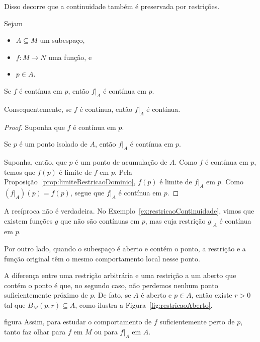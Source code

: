Disso decorre que a continuidade também é preservada por restrições.

\begin{corollary}\label{cor:continuidadeRestricao}
    Sejam
    \begin{itemize}
        \item $A\subseteq M$ um subespaço,
        \item $f: M \to N$ uma função, e
        \item $p\in A$.
    \end{itemize}

    Se $f$ é contínua em $p$, então $f|_A$ é contínua em $p$.

    Consequentemente, se $f$ é contínua, então $f|_A$ é contínua.
\end{corollary}

\begin{proof}
    Suponha que $f$ é contínua em $p$.

    Se $p$ é um ponto isolado de $A$, então $f|_A$ é contínua em $p$.

    Suponha, então, que $p$ é um ponto de acumulação de $A$.
    Como $f$ é contínua em $p$, temos que $f(p)$ é limite de $f$ em $p$.
    Pela Proposição~\ref{prop:limiteRestricaoDominio}, $f(p)$ é limite de $f|_A$ em $p$.
    Como $(f|_A)(p)=f(p)$, segue que $f|_A$ é contínua em $p$.
\end{proof}

A recíproca não é verdadeira.
No Exemplo~\ref{ex:restricaoContinuidade}, vimos que existem funções $g$ que não são contínuas em $p$, mas cuja restrição $g|_A$ é contínua em $p$.

Por outro lado, quando o subespaço é aberto e contém o ponto, a restrição e a função original têm o mesmo comportamento local nesse ponto.

A diferença entre uma restrição arbitrária e uma restrição a um aberto que contém o ponto é que, no segundo caso, não perdemos nenhum ponto suficientemente próximo de $p$.
De fato, se $A$ é aberto e $p\in A$, então existe $r>0$ tal que $B_M(p,r)\subseteq A$, como ilustra a Figura~\ref{fig:restricaoAberto}.

{figura}
Assim, para estudar o comportamento de $f$ suficientemente perto de $p$, tanto faz olhar para $f$ em $M$ ou para $f|_A$ em $A$.

